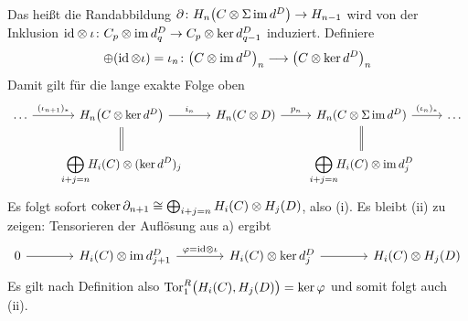 \begin{beweis}
\begin{enumerate}[a)]
\[\begin{tikzcd}
			\end{tikzcd}
		\]
		Das heißt die Randabbildung $\partial \colon H_n \enbrace*{C \otimes \Sigma \im d^D} \to H_{n-1}$ wird von der Inklusion ${\id} \otimes \iota \colon C_p \otimes \im d^D_q \to C_p \otimes \ker d_{q-1}^D$ induziert.
		Definiere
		\[
			\oplus (\id \otimes \iota) =\iota_n \colon \enbrace*{C \otimes  \im d^D}_n \longrightarrow \enbrace*{C \otimes \ker d^D}_n
		\]
		Damit gilt für die lange exakte Folge oben
		\[
			\begin{tikzcd}[sep=2em]
				\ldots  \rar["(\iota_{n+1})_*"] & H_n \enbrace*{C \otimes \ker d^D} \dar[equal] \rar["i_n"] & H_n(C \otimes D) \rar["p_n"] & H_n (C \otimes \Sigma \im d^D) \rar["(\iota_n)_*"] \dar[equal] &  \ldots  \\
				& \displaystyle\bigoplus_{i+j=n}\!\! H_i(C) \otimes (\ker d^D)_j & & \displaystyle \bigoplus_{i+j=n}\!\! H_i(C) \otimes \im d^D_j
			\end{tikzcd}
		\]
		Es folgt sofort $\coker \partial_{n+1} \cong \bigoplus_{i+j=n} H_i(C) \otimes H_j(D)$, also (i).
		Es bleibt (ii) zu zeigen:
		Tensorieren der Auflösung aus a) ergibt 
		\[
			\begin{tikzcd}[sep=3.7em]
				0 \rar & H_i(C) \otimes  \im d_{j+1}^D \rar["\varphi={\id} \otimes \iota"] & H_i(C) \otimes \ker d_j^D \rar & H_i(C) \otimes H_j(D)
			\end{tikzcd}
		\]
		Es gilt nach Definition also $\Tor_1^R \enbrace[\big]{H_i(C) ,H_j(D)} = \ker \varphi$ und somit folgt auch (ii).\qedhere
	\end{enumerate}
\end{beweis}

